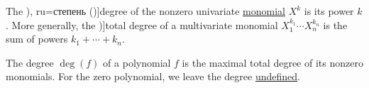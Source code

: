 \begin{definition}\label{def:polynomial_degree}
  The \term[bg=степен (\cite[1]{Обрешков1962ВисшаАлгебра}), ru=степень (\cite[\S 8.1]{Тыртышников2007ЛинейнаяАлгебра})]{degree} of the nonzero univariate \hyperref[def:polynomial_algebra]{monomial} \( X^k \) is its power \( k \). More generally, the \term[en=total degree (\cite[103]{Lang2002Algebra})]{total degree} of a multivariate monomial \( X_1^{k_1} \cdots X_n^{k_n} \) is the sum of powers \( k_1 + \cdots + k_n \).

  The degree \( \deg(f) \) of a polynomial \( f \) is the maximal total degree of its nonzero monomials. For the zero polynomial, we leave the degree \hyperref[con:undefinedness]{undefined}.
\end{definition}

